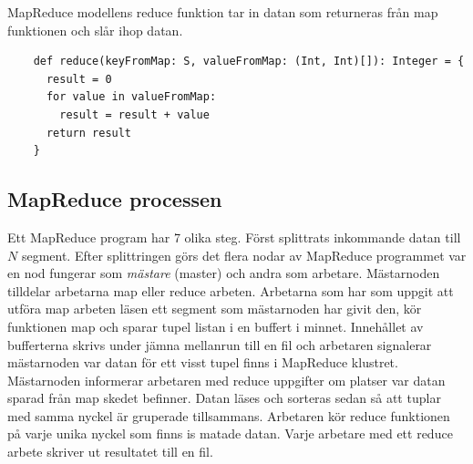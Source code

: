 MapReduce modellens reduce funktion tar in datan som returneras från map funktionen och slår ihop datan. 

\begin{verbatim}
    def reduce(keyFromMap: S, valueFromMap: (Int, Int)[]): Integer = {
      result = 0
      for value in valueFromMap:
        result = result + value
      return result
    }
\end{verbatim}

\subsection{MapReduce processen}

Ett MapReduce program har 7 olika steg. Först splittrats inkommande datan till $N$ segment. Efter splittringen
görs det flera nodar av MapReduce programmet var en nod fungerar som \textit{mästare} (master) och andra
som arbetare. Mästarnoden tilldelar arbetarna map eller reduce arbeten. Arbetarna som har som uppgit att utföra map arbeten
läsen ett segment som mästarnoden har givit den, kör funktionen map och sparar tupel listan i en buffert i minnet.
Innehållet av bufferterna skrivs under jämna mellanrun till en fil och arbetaren signalerar mästarnoden var datan för ett visst
tupel finns i MapReduce klustret. Mästarnoden informerar arbetaren med reduce uppgifter om platser var datan sparad från map skedet
befinner. Datan läses och sorteras sedan så att tuplar med samma nyckel är gruperade tillsammans. Arbetaren kör reduce funktionen på varje
unika nyckel som finns is matade datan. Varje arbetare med ett reduce arbete skriver ut resultatet till en fil.

